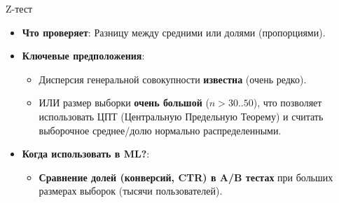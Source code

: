 \begin{myexampleblock}{Z-тест}
\begin{itemize}
    \item \textbf{Что проверяет}: Разницу между средними или долями (пропорциями).
    \item \textbf{Ключевые предположения}:
        \begin{itemize}
            \item Дисперсия генеральной совокупности \textbf{известна} (очень редко).
            \item ИЛИ размер выборки \textbf{очень большой} ($n > 30..50$), что позволяет использовать ЦПТ (Центральную Предельную Теорему) и считать выборочное среднее/долю нормально распределенными.
        \end{itemize}
    \item \textbf{Когда использовать в ML?}:
        \begin{itemize}
            \item \textbf{Сравнение долей (конверсий, CTR) в A/B тестах} при больших размерах выборок (тысячи пользователей).
        \end{itemize}
\end{itemize}
\end{myexampleblock}

